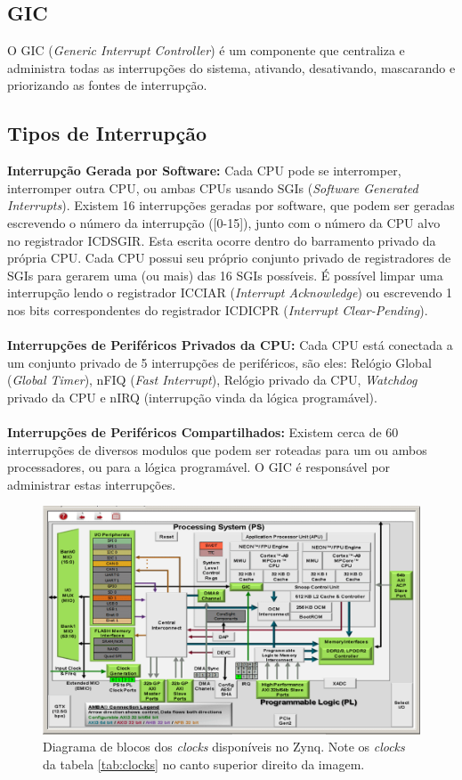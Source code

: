 \documentclass{ufscThesis/ufscThesis} %
\begin{document}
\subsection{GIC}
O GIC (\emph{Generic Interrupt Controller}) é um componente que centraliza e administra todas as interrupções do sistema, ativando, desativando, mascarando e priorizando as fontes de interrupção.


\subsection{Tipos de Interrupção} %
\label{sec:interrupt}
\textbf{Interrupção Gerada por Software: }
Cada CPU pode se interromper, interromper outra CPU, ou ambas CPUs usando SGIs (\emph{Software Generated Interrupts}). Existem 16 interrupções geradas por software, que podem ser geradas escrevendo o número da interrupção ([0-15]), junto com o número da CPU alvo no registrador ICDSGIR. Esta escrita ocorre dentro do barramento privado da própria CPU. Cada CPU possui seu próprio conjunto privado de registradores de SGIs para gerarem uma (ou mais) das 16 SGIs possíveis. É possível limpar uma interrupção lendo o registrador ICCIAR (\emph{Interrupt Acknowledge}) ou escrevendo 1 nos bits correspondentes do registrador ICDICPR (\emph{Interrupt Clear-Pending}).
\\\\
\textbf{Interrupções de Periféricos Privados da CPU: }
Cada CPU está conectada a um conjunto privado de 5 interrupções de periféricos, são eles: Relógio Global (\emph{Global Timer}), nFIQ (\emph{Fast Interrupt}), Relógio privado da CPU, \emph{Watchdog} privado da CPU e nIRQ (interrupção vinda da lógica programável).
\\\\
\textbf{Interrupções de Periféricos Compartilhados: }
Existem cerca de 60 interrupções de diversos modulos que podem ser roteadas para um ou ambos processadores, ou para a lógica programável. O GIC é responsável por administrar estas interrupções.

\begin{figure}[ht!]
	\centerline{
    \includegraphics[width=13cm]{figuras/zynq-7000}
	}
    \caption{Diagrama de blocos dos \emph{clocks} disponíveis no Zynq. Note os \emph{clocks} da tabela \ref{tab:clocks} no canto superior direito da imagem.}
\end{figure}
\end{document}
